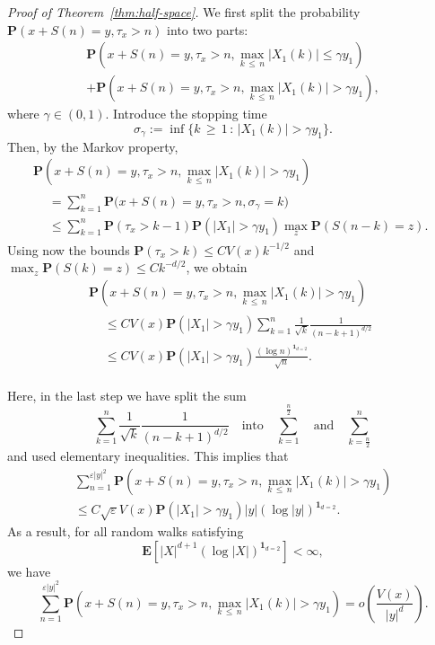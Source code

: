 \documentclass[10pt]{amsart}
\theoremstyle{definition}\newtheorem{defi}[theo]{Definition}\newtheorem{rema}[theo]{Remark}\newtheorem{exam}[theo]{Example}\newtheorem{exem}[theo]{Example}\newtheorem{nota}[theo]{Notation}
\newcommand{\pr}{\mathbf{P}}
\newcommand{\e}{\mathbf{E}}
\newcommand{\ind}{\mathbf{1}}
\renewcommand{\le}{\leqslant}
\renewcommand{\ge}{\geqslant}
\begin{document}
\begin{proof}[Proof of Theorem~\ref{thm:half-space}]
We first split the probability $\pr(x+S(n)=y,\tau_x>n)$ into two parts:
\begin{multline*}
\pr\left(x+S(n)=y,\tau_x>n,\max_{k\,\le\,n}\left| X_1(k)\right|\le\gamma y_1\right)\\
+\pr\left(x+S(n)
=y,\tau_x>n,\max_{k\,\le\,n}\left| X_1(k)\right|>\gamma y_1\right),
\end{multline*}
where $\gamma\in(0,1)$. Introduce the stopping time
\[
\sigma_\gamma:=\inf\big\{k\,\ge\,1\,:\,\left| X_1(k)\right|>\gamma y_1\big\}.
\]
Then, by the Markov property,
\begin{multline*}
\pr\left(x+S(n)=y,\tau_x>n,\max_{k\,\le\,n}\left| X_1(k)\right|>\gamma y_1\right)\\
\begin{aligned}
& =\sum_{k=1}^n \pr\big(x+S(n)=y,\tau_x>n,\sigma_\gamma=k\big)\\
& \le\sum_{k=1}^n\pr\left(\tau_x>k-1\right)\pr\left(\left|X_1\right|>\gamma y_1\right)\max_z\pr\left(S(n-k)=z\right).
\end{aligned}
\end{multline*}
Using now the bounds $\pr(\tau_x>k)\le CV(x)k^{-1/2}$ and $\max_z\pr(S(k)=z)\le Ck^{-d/2}$, we obtain
\begin{multline*}
\pr\left(x+S(n)=y,\tau_x>n,\max_{k\,\le\,n}\left| X_1(k)\right|>\gamma y_1\right)\\
\begin{aligned}
&\le CV(x)\pr\left(|X_1|>\gamma y_1\right)\sum_{k=1}^n\frac{1}{\sqrt{k}}\frac{1}{(n-k+1)^{d/2}}\\
&\le C V(x)\pr\left(| X_1|>\gamma y_1\right)\frac{(\log n)^{\ind_{d=2}}}{\sqrt{n}}.
\end{aligned}
\end{multline*}

Here, in the last step we have split the sum
\[
\sum_{k=1}^n\frac{1}{\sqrt{k}}\frac{1}{(n-k+1)^{d/2}}\quad\text{into}\quad\sum_{k=1}^\frac{n}{2}\quad\text{and}\quad\sum_{k=\frac{n}{2}}^n
\]
and used elementary inequalities. This implies that
\begin{multline}\label{eq:new.est.2}
\sum_{n=1}^{\varepsilon|y|^2}\pr\left(x+S(n)=y,\tau_x>n,\max_{k\,\le\,n}| X_1(k)|>\gamma y_1\right)\\
\le C\sqrt{\varepsilon}V(x)\pr\left(| X_1|>\gamma y_1\right)|y|\left(\log |y|\right)^{\ind_{d=2}}.
\end{multline}
As a result, for all random walks satisfying
\[
\e\left[| X|^{d+1}\left(\log | X|\right)^{\ind_{d=2}}\right]<\infty,
\]
we have
\begin{equation}\label{half-space.2}
\sum_{n=1}^{\varepsilon|y|^2}\pr\left(x+S(n)=y,\tau_x>n,\max_{k\,\le\,n}| X_1(k)|>\gamma y_1\right) =o\left(\frac{V(x)}{|y|^d}\right).
\end{equation}


\end{proof}
\end{document}
